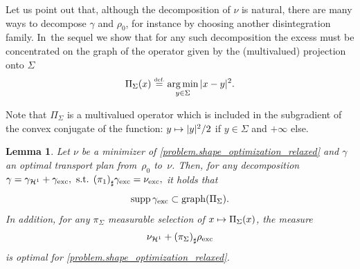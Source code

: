 \documentclass[10pt]{amsart}
\newcommand\mto{\mathchoice{\longmapsto}{\mapsto}{\mapsto}{\mapsto}}
\newtheorem{lemma}[theorem]{Lemma}
\theoremstyle{definition}
\newcommand{\eqdef}{\ensuremath{\stackrel{\mbox{\upshape\tiny def.}}{=}}}
\newcommand\cH{\mathcal{H}}
\DeclareMathOperator*{\argmin}{arg\,min}
\DeclareMathOperator{\supp}{supp}
\newcommand{\nuexc}{\nu_{\textup{exc}}}
\newcommand{\nuH}{\nu_{\cH^1}}
\newcommand{\rhoexc}{\rho_{\textup{exc}}}
\newcommand{\gammaexc}{\gamma_{\textup{exc}}}
\newcommand{\gammaH}{\gamma_{\cH^1}}
\begin{document}
Let us point out that, although the decomposition of $\nu$ is natural, there are many ways to decompose $\gamma$ and $\rho_0$, for instance by choosing another disintegration family. In~the sequel we show that for any such decomposition the excess must be concentrated on the graph of the operator given by the (multivalued) projection onto $\Sigma$
\begin{equation}\label{projection_operator}
\Pi_\Sigma(x) \eqdef \argmin_{y \in \Sigma} |x - y|^2.
\end{equation}

Note that $\Pi_\Sigma$ is a multivalued operator which is included in the subgradient of the convex conjugate of the function:
$y\mto |y|^2/2$ if $y\in \Sigma$ and $+\infty$ else.
\begin{lemma}\label{lemma.minimal_distance2Sigma}
Let $\nu$ be a minimizer of \eqref{problem.shape_optimization_relaxed} and $\gamma$ an optimal transport plan from~$\rho_0$ to~$\nu$. Then, for any decomposition
$
\gamma =
\gammaH+ \gammaexc,
\text{ s.t. }
{(\pi_{1})}_\sharp \gammaexc = \nuexc,
$
it holds that\vspace*{-3pt}
\begin{equation}
\supp \gammaexc \subset \mathrm{graph}(\Pi_\Sigma).\label{eqgammaexcproj}
\end{equation}
In addition, for any $\pi_\Sigma$ measurable selection of $x\mto \Pi_\Sigma(x)$, the measure\vspace*{-3pt}
\[
\nuH + {(\pi_{\Sigma})}_\sharp\rhoexc
\]
is optimal for \eqref{problem.shape_optimization_relaxed}.
\end{lemma}
\end{document}
